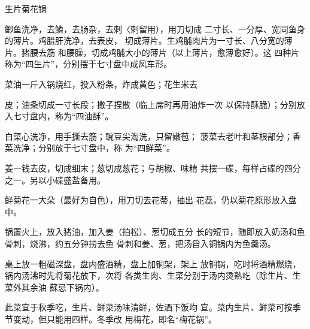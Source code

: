 \begin{recipe}{生片菊花锅}

\ingredients



\cooking

\step 鲫鱼洗净，去鱗，去肠杂，去刺〈刺留用），用刀切成 二寸长、一分厚、宽同鱼身的薄片。鸡腊肝洗净，去表皮， 切成薄片。生鸡脯肉片为一寸长、八分宽的薄片。猪腰去筋 和腰臊，切成鸡脯大小的薄片（以上薄片，愈薄愈好）。这 四种片称为“四生片”，分别摆于七寸盘中成风车形。

\step 菜油一斤入锅烧红，投入粉条，炸成黄色；花生米去

皮；油条切成一寸长段；撒子捏散（临上席时再用油炸一次 以保持酥脆）；分别放入七寸盘内，称为“四油酥”。

白菜心洗净，用手撕去筋；豌豆尖淘洗，只留嫩苞； 菠菜去老叶和茎根部分；香菜洗净；分别放于七寸盘中，称 为“四鲜菜”。

\step 姜一钱去皮，切成细末；葱切成葱花；与胡椒、味精 共摆一碟，每样占碟的四分之一。另以小碟盛盐备用。

\step 鲜菊花一大朵（最好为自色），用刀切去花蒂，抽出 花蕊，仍以菊花原形放入盘中。

\step 锅置火上，放入猪油，加入姜（拍松）、葱切成五分 长的短节，随即放入奶汤和鱼骨刺，烧沸，约五分钟捞去鱼 骨刺和姜、葱，把汤舀入铜锅内为鱼羹汤。

\step 桌上放一粗磁深盘，盘内盛酒精，盘上加铜架，架上 放铜锅，吃时将酒精燃烧，锅内汤沸时先将菊花放下，次将 各类生肉、生菜分别于汤内烫熟吃（除生片、生菜外其余油 蘇忌下锅内）。

\notes

此菜宜于秋季吃，生片、鲜菜汤味清鲜，佐酒下饭均 宜。菜内生片、鲜菜可按季节变动，但只能用四样。冬季改 用梅花，即名“梅花锅”。

\end{recipe}

